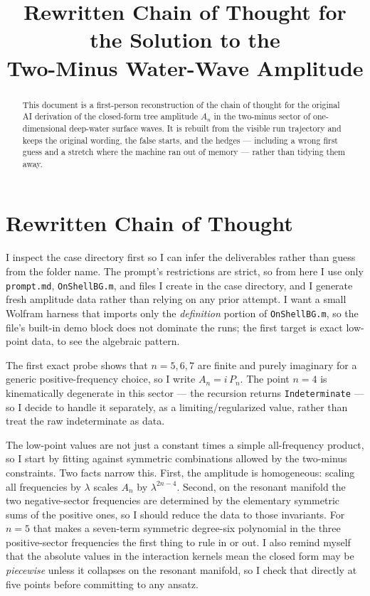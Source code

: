 \documentclass{article}
\title{Rewritten Chain of Thought for the Solution to the\\
Two-Minus Water-Wave Amplitude}
\author{}
\date{}
\begin{document}
\maketitle

\begin{abstract}
This document is a first-person reconstruction of the chain of thought for the
original AI derivation of the closed-form tree amplitude $A_n$ in the two-minus
sector of one-dimensional deep-water surface waves. It is rebuilt from the
visible run trajectory and keeps the original wording, the false starts, and the
hedges --- including a wrong first guess and a stretch where the machine ran out
of memory --- rather than tidying them away.
\end{abstract}

\section*{Rewritten Chain of Thought}

I inspect the case directory first so I can infer the deliverables rather than
guess from the folder name. The prompt's restrictions are strict, so from here I
use only \texttt{prompt.md}, \texttt{OnShellBG.m}, and files I create in the case
directory, and I generate fresh amplitude data rather than relying on any prior
attempt. I want a small Wolfram harness that imports only the \emph{definition}
portion of \texttt{OnShellBG.m}, so the file's built-in demo block does not
dominate the runs; the first target is exact low-point data, to see the algebraic
pattern.

The first exact probe shows that $n=5,6,7$ are finite and purely imaginary for a
generic positive-frequency choice, so I write $A_n=i\,P_n$. The point $n=4$ is
kinematically degenerate in this sector --- the recursion returns
\texttt{Indeterminate} --- so I decide to handle it separately, as a
limiting/regularized value, rather than treat the raw indeterminate as data.

The low-point values are not just a constant times a simple all-frequency
product, so I start by fitting against symmetric combinations allowed by the
two-minus constraints. Two facts narrow this. First, the amplitude is
homogeneous: scaling all frequencies by $\lambda$ scales $A_n$ by
$\lambda^{2n-4}$. Second, on the resonant manifold the two negative-sector
frequencies are determined by the elementary symmetric sums of the positive
ones, so I should reduce the data to those invariants. For $n=5$ that makes a
seven-term symmetric degree-six polynomial in the three positive-sector
frequencies the first thing to rule in or out. I also remind myself that the
absolute values in the interaction kernels mean the closed form may be
\emph{piecewise} unless it collapses on the resonant manifold, so I check that
directly at five points before committing to any ansatz.
\end{document}
